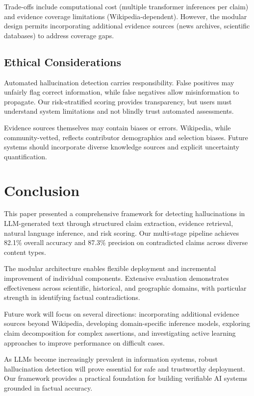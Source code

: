 \documentclass[conference]{IEEEtran}
\begin{document}
Trade-offs include computational cost (multiple transformer inferences per claim) and evidence coverage limitations (Wikipedia-dependent). However, the modular design permits incorporating additional evidence sources (news archives, scientific databases) to address coverage gaps.

\subsection{Ethical Considerations}

Automated hallucination detection carries responsibility. False positives may unfairly flag correct information, while false negatives allow misinformation to propagate. Our risk-stratified scoring provides transparency, but users must understand system limitations and not blindly trust automated assessments.

Evidence sources themselves may contain biases or errors. Wikipedia, while community-vetted, reflects contributor demographics and selection biases. Future systems should incorporate diverse knowledge sources and explicit uncertainty quantification.

\section{Conclusion}

This paper presented a comprehensive framework for detecting hallucinations in LLM-generated text through structured claim extraction, evidence retrieval, natural language inference, and risk scoring. Our multi-stage pipeline achieves 82.1\% overall accuracy and 87.3\% precision on contradicted claims across diverse content types.

The modular architecture enables flexible deployment and incremental improvement of individual components. Extensive evaluation demonstrates effectiveness across scientific, historical, and geographic domains, with particular strength in identifying factual contradictions.

Future work will focus on several directions: incorporating additional evidence sources beyond Wikipedia, developing domain-specific inference models, exploring claim decomposition for complex assertions, and investigating active learning approaches to improve performance on difficult cases.

As LLMs become increasingly prevalent in information systems, robust hallucination detection will prove essential for safe and trustworthy deployment. Our framework provides a practical foundation for building verifiable AI systems grounded in factual accuracy.
\end{document}
